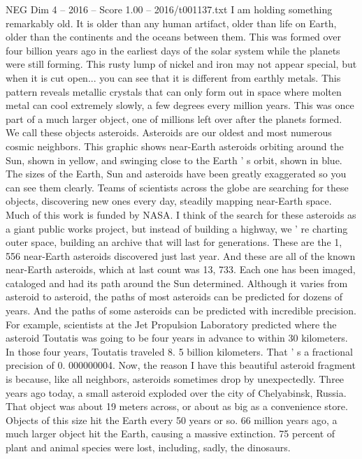 \begin{textsample}{NEG Dim 4 – 2016 – Score 1.00 – 2016/t001137.txt}  \label{ex:f4_neg_042}
I am holding something remarkably old.
It is older than any human artifact, older than life on Earth, older than the continents and the oceans between them.
This was formed over four billion years ago in the earliest days of the solar system while the planets were still forming.
This rusty lump of nickel and iron may not appear special, but when it is cut open... you can see that it is different from earthly metals.
This pattern reveals metallic crystals that can only form out in space where molten metal can cool extremely slowly, a few degrees every million years.
This was once part of a much larger object, one of millions left over after the planets formed.
We call these objects asteroids.
Asteroids are our oldest and most numerous cosmic neighbors.
This graphic shows near-Earth asteroids orbiting around the Sun, shown in yellow, and swinging close to the Earth ' s orbit, shown in blue.
The sizes of the Earth, Sun and asteroids have been greatly exaggerated so you can see them clearly.
Teams of scientists across the globe are searching for these objects, discovering new ones every day, steadily mapping near-Earth space.
Much of this work is funded by NASA.
I think of the search for these asteroids as a giant public works project, but instead of building a highway, we ' re charting outer space, building an archive that will last for generations.
These are the 1, 556 near-Earth asteroids discovered just last year.
And these are all of the known near-Earth asteroids, which at last count was 13, 733.
Each one has been imaged, cataloged and had its path around the Sun determined.
Although it varies from asteroid to asteroid, the paths of most asteroids can be predicted for dozens of years.
And the paths of some asteroids can be predicted with incredible precision.
For example, scientists at the Jet Propulsion Laboratory predicted where the asteroid Toutatis was going to be four years in advance to within 30 kilometers.
In those four years, Toutatis traveled 8. 5 billion kilometers.
That ' s a fractional precision of 0. 000000004.
Now, the reason I have this beautiful asteroid fragment is because, like all neighbors, asteroids sometimes drop by unexpectedly.
Three years ago today, a small asteroid exploded over the city of Chelyabinsk, Russia.
That object was about 19 meters across, or about as big as a convenience store.
Objects of this size hit the Earth every 50 years or so. 66 million years ago, a much larger object hit the Earth, causing a massive extinction. 75 percent of plant and animal species were lost, including, sadly, the dinosaurs.

\end{textsample}
